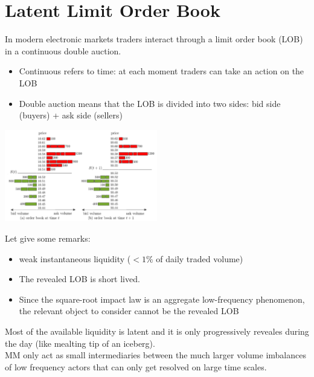 \section{Latent Limit Order Book}
In modern electronic markets traders interact through a limit order book (LOB) in a continuous double auction.
\begin{itemize}
	\item Continuous refers to time: at each moment traders can take an action on the LOB
	\item Double auction means that the LOB is divided into two sides: bid side (buyers) + ask side (sellers)
\end{itemize}
\begin{center}
	\includegraphics[width=0.5\textwidth]{picture/(25)snapshot_lob.png}
\end{center}
Let give some remarks:
\begin{itemize}
	\item weak instantaneous liquidity ($< 1 \%$ of daily traded volume)
	\item The revealed LOB is short lived.
	\item Since the square-root impact law is an aggregate low-frequency phenomenon, the relevant object to consider cannot be the revealed LOB
\end{itemize}
Most of the available liquidity is latent and it is only progressively reveales during the day (like mealting tip of an iceberg).\\
MM only act as small intermediaries between the much larger volume imbalances of low frequency actors that can only get resolved on large time scales.
